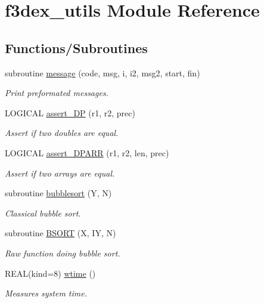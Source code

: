 \hypertarget{namespacef3dex__utils}{
\section{f3dex\_\-utils Module Reference}
\label{namespacef3dex__utils}
}
\subsection*{Functions/Subroutines}
\begin{DoxyCompactItemize}
\item 
subroutine \hyperlink{namespacef3dex__utils_a92226ca7c662562058c56ba005f6fc36}{message} (code, msg, i, i2, msg2, start, fin)
\begin{DoxyCompactList}\small\item\em Print preformated messages. \end{DoxyCompactList}\item 
LOGICAL \hyperlink{namespacef3dex__utils_ad4cb6613ee589637f453ef808466a0f9}{assert\_\-DP} (r1, r2, prec)
\begin{DoxyCompactList}\small\item\em Assert if two doubles are equal. \end{DoxyCompactList}\item 
LOGICAL \hyperlink{namespacef3dex__utils_a234414d8daaf5e3bfd03754331b467ed}{assert\_\-DPARR} (r1, r2, len, prec)
\begin{DoxyCompactList}\small\item\em Assert if two arrays are equal. \end{DoxyCompactList}\item 
subroutine \hyperlink{namespacef3dex__utils_aa75468d58041cdc91e52ce3fadb073b3}{bubblesort} (Y, N)
\begin{DoxyCompactList}\small\item\em Classical bubble sort. \end{DoxyCompactList}\item 
subroutine \hyperlink{namespacef3dex__utils_a2cce76cb1a695da8315cbf60507ec322}{BSORT} (X, IY, N)
\begin{DoxyCompactList}\small\item\em Raw function doing bubble sort. \end{DoxyCompactList}\item 
REAL(kind=8) \hyperlink{namespacef3dex__utils_ac5aa172010ec6cd9bd4c5273904b0405}{wtime} ()
\begin{DoxyCompactList}\small\item\em Measures system time. \end{DoxyCompactList}\item 

\end{DoxyCompactItemize}
